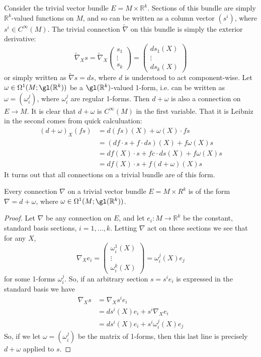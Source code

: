 Consider the trivial vector bundle $E = M \times \mathbb R^k$. Sections of this bundle are simply $\mathbb R^k$-valued functions on $M$, and so can be written as a column vector $(s^i)$, where $s^i \in C^\infty(M)$. The trivial connection $\tilde{\nabla}$ on this bundle is simply the exterior derivative:
\[ \tilde{\nabla}_X s = \tilde{\nabla}_X \begin{pmatrix} s_1 \\ \vdots \\ s_k \end{pmatrix} = \begin{pmatrix} ds_1(X) \\ \vdots \\ ds_k(X) \end{pmatrix} \]
or simply written as $\tilde{\nabla} s = ds$, where $d$ is understood to act component-wise. Let $\omega \in \Omega^1(M;\gl(\mathbb R^k))$ be a $\gl(\mathbb R^k)$-valued 1-form, i.e. can be written as $\omega = (\omega_i^j)$, where $\omega_i^j$ are regular 1-forms. Then $d+\omega$ is also a connection on $E \rightarrow M$. It is clear that $d+\omega$ is $C^\infty(M)$ in the first variable. That it is Leibniz in the second comes from quick calculuation:
\begin{align*}
	(d+\omega)_X (fs) &= d(fs)(X) + \omega(X) \cdot fs \\
	                  &= (df \cdot s + f \cdot ds)(X) + f \omega(X) s \\
	                  &= df(X) \cdot s + f c\cdot ds(X) + f \omega(X) s \\
	                  &= df(X) \cdot s + f (d + \omega)(X) s
\end{align*}
It turns out that all connections on a trivial bundle are of this form.
\begin{prop}
Every connection $\nabla$ on a trivial vector bundle $E = M \times R^k$ is of the form $\nabla = d + \omega$, where $\omega \in \Omega^1(M; \gl(\mathbb R^k))$. 
\end{prop}
\begin{proof}
Let $\nabla$ be any connection on $E$, and let $e_i : M \rightarrow \mathbb R^k$ be the constant, standard basis sections, $i = 1, \ldots, k$. Letting $\nabla$ act on these sections we see that for any $X$,
\[ \nabla_X e_i = \begin{pmatrix} \omega_i^1(X) \\ \vdots \\ \omega_i^k(X) \end{pmatrix} = \omega_i^j(X) e_j \]
for some 1-forms $\omega_i^j$. So, if an arbitrary section $s = s^i e_i$ is expressed in the standard basis we have
\begin{align*}
	\nabla_X s &= \nabla_X s^i e_i \\
	           &= ds^i(X) e_i + s^i \nabla_X e_i \\
	           &= ds^i(X) e_i + s^i \omega_i^j(X) e_j 
\end{align*}
So, if we let $\omega = (\omega_i^j)$ be the matrix of 1-forms, then this last line is precisely $d+\omega$ applied to $s$.
\end{proof}

